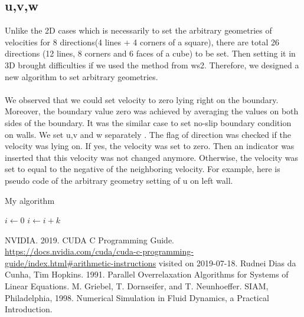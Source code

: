 \documentclass{article}%
\begin{document}
\subsection{u,v,w}
Unlike the 2D cases which is necessarily to set the arbitrary geometries of velocities for 8 directions(4 lines + 4 corners of a square), there are total 26 directions (12 lines, 8 corners and 6 faces of a cube) to be set. Then setting it in 3D brought difficulties if we used the method from ws2.  Therefore, we designed a new algorithm to set arbitrary geometries.\\
\\
We observed that we could set velocity to zero lying right on the boundary. Moreover, the boundary value zero was achieved by averaging the values on both sides of the boundary. It was the similar case to set no-slip boundary condition on walls.  We set u,v and w separately . The flag of direction was checked if the velocity was lying on. If yes, the velocity was set to zero. Then an indicator was inserted that this velocity was not changed anymore. Otherwise, the velocity was set to equal to the negative of the neighboring velocity.  For example, here is pseudo code of the arbitrary geometry setting of u on left wall.
\begin{algorithm}
\caption{My algorithm}\label{euclid}
\begin{algorithmic}
    \State $i\gets 0$
\Else
        \State $i\gets i+k$
    \EndIf
\EndIf
\end{algorithmic}
\end{algorithm}

\begin{thebibliography}{999}

NVIDIA. 2019. CUDA C Programming Guide. \url{https://docs.nvidia.com/cuda/cuda-c-programming-guide/index.html#arithmetic-instructions} visited on 2019-07-18.
Rudnei Dias da Cunha, Tim Hopkins. 1991. Parallel Overrelaxation Algorithms for Systems of Linear Equations.
M. Griebel, T. Dornseifer, and T. Neunhoeffer. SIAM, Philadelphia, 1998. Numerical Simulation in Fluid Dynamics, a Practical Introduction.
\end{thebibliography}
\end{document}
